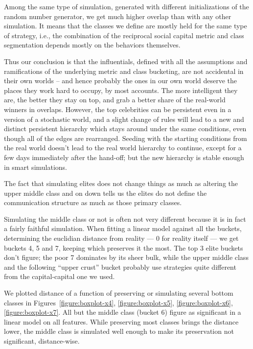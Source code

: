 \documentclass[10pt,oneside]{memoir}
\begin{document}
\begin{Spacing}{2}
Among the same type of simulation, generated with different initializations of the random number generator, we get much higher overlap than with any other simulation.  It means that the classes we define are mostly held for the same type of strategy, i.e., the combination of the reciprocal social capital metric and class segmentation depends mostly on the behaviors themselves.


Thus our conclusion is that the influentials, defined with all the assumptions and ramifications of the underlying metric and class bucketing, are not accidental in their own worlds -- and hence probably the ones in our own world deserve the places they work hard to occupy, by most accounts.  The more intelligent they are, the better they stay on top, and grab a better share of the real-world winners in overlaps.  However, the top celebrities can be persistent even in a version of a stochastic world, and a slight change of rules will lead to a new and distinct persistent hierarchy which stays around under the same conditions, even though all of the edges are rearranged.  Seeding with the starting conditions from the real world doesn't lead to the real world hierarchy to continue, except for a few days immediately after the hand-off; but the new hierarchy is stable enough in smart simulations.


The fact that simulating elites does not change things as much as altering the upper middle class and on down tells us the elites do not define the communication structure as much as those primary classes.


Simulating the middle class or not is often not very different because it is in fact a fairly faithful simulation.  When fitting a linear model against all the buckets, determining the euclidian distance from reality --- 0 for reality itself --- we get buckets 4, 5 and 7, keeping which preserves it the most.  The top 3 elite buckets don't figure; the poor 7 dominates by its sheer bulk, while the upper middle class and the following ``upper crust'' bucket probably use strategies quite different from the capital-capital one we used.


We plotted distance of a function of preserving or simulating several bottom classes in Figures~\ref{figure:boxplot-x4}, \ref{figure:boxplot-x5}, \ref{figure:boxplot-x6}, \ref{figure:boxplot-x7}.  All but the middle class (bucket 6) figure as significant in a linear model on all features.  While preserving most classes brings the distance lower, the middle class is simulated well enough to make its preservation not significant, distance-wise.




\end{Spacing}
\end{document}
